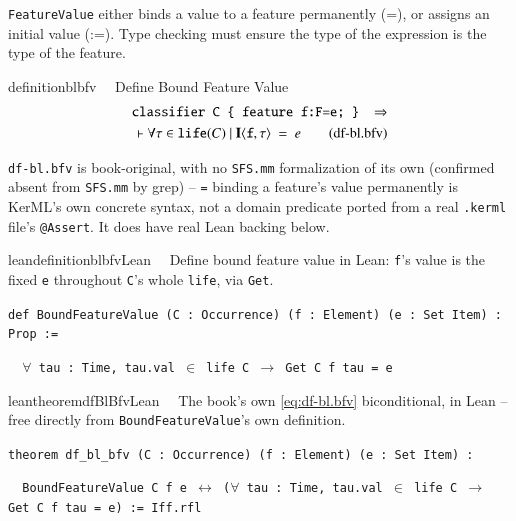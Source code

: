 
\label{sec:value}

\texttt{FeatureValue} either binds a value to a feature permanently (=), or assigns an initial value (:=).  Type checking must ensure the type of the expression is the type of the feature.

\begin{restatable}{definition}{blbfv}~~ Define Bound Feature Value
\begin{align}
\texttt{classifier C \{ feature f:F=e; \} }~\Rightarrow \notag \\
\vdash \forall \tau \in \texttt{life}(C)~\vert~  \textbf{I}\langle \texttt{f},\tau\rangle~=~e
\label{eq:df-bl.bfv}\tag{df-bl.bfv}
\end{align}
\end{restatable}

\pn \texttt{df-bl.bfv} is book-original, with no \texttt{SFS.mm} formalization of its own (confirmed
absent from \texttt{SFS.mm} by grep) -- \texttt{=} binding a feature's value permanently is KerML's
own concrete syntax, not a domain predicate ported from a real \texttt{.kerml} file's \texttt{@Assert}.
It does have real Lean backing below.

\begin{restatable}{leandefinition}{blbfvLean}~~ Define bound feature
value in Lean: \texttt{f}'s value is the fixed \texttt{e} throughout \texttt{C}'s whole
\texttt{life}, via \texttt{Get}.

\texttt{\textcolor{leancolor}{def} \textcolor{leanyellow}{BoundFeatureValue} (C : Occurrence) (f : Element) (e : Set Item) : Prop :=}

\texttt{~~$\forall$ tau : Time, tau.val $\in$ life C $\to$ Get C f tau = e}
\label{BoundFeatureValue}
\end{restatable}

\begin{restatable}{leantheorem}{dfBlBfvLean}~~ The book's own \ref{eq:df-bl.bfv}
biconditional, in Lean -- free directly from \texttt{BoundFeatureValue}'s own definition.

\texttt{\textcolor{leancolor}{theorem} \textcolor{leanyellow}{df\_bl\_bfv} (C : Occurrence) (f : Element) (e : Set Item) :}

\texttt{~~BoundFeatureValue C f e $\leftrightarrow$ ($\forall$ tau : Time, tau.val $\in$ life C $\to$ Get C f tau = e) := Iff.rfl}
\label{df_bl_bfv}
\end{restatable}

